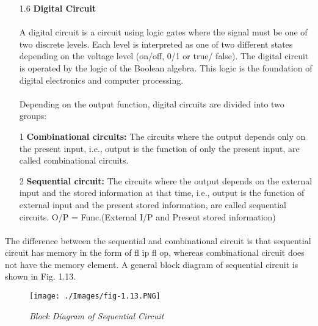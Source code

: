 \documentclass[10.5pt]{article}
\begin{document}
\begin{center}
\begin{enumerate}
		\item[1.6] \textbf{Digital Circuit}
		\paragraph{}
A digital circuit is a circuit using logic gates where the signal must be one of two discrete levels. Each
level is interpreted as one of two different states depending on the voltage level (on/off, 0/1 or true/
false). The digital circuit is operated by the logic of the Boolean algebra. This logic is the foundation of
digital electronics and computer processing.
\paragraph{}
Depending on the output function, digital circuits are divided into two  groups:
		\item[1] \textbf{Combinational circuits:}
 The circuits where the output depends only on the present input, i.e.,
output is the function of only the present input, are called combinational circuits.
   \item[2]
   \textbf{Sequential circuit:} The circuits where the output depends on the external input and the stored
information at that time, i.e., output is the function of external input and the present stored information,
are called sequential circuits.
O/P = Func.(External I/P and Present stored information)
\end{enumerate}
\end{center}

\clearpage
\paragraph{}
The difference between the sequential and combinational circuit is that sequential circuit has memory
in the form of fl ip fl op, whereas combinational circuit does not have the memory element. A general
block diagram of sequential circuit is shown in Fig. 1.13.
\begin{figure}[h!]
	\begin{center}	
		\texttt{[image: ./Images/fig-1.13.PNG]}
			\caption{\textit{Block Diagram of Sequential Circuit}}
  	\end{center}
\end{figure}
\end{document}

